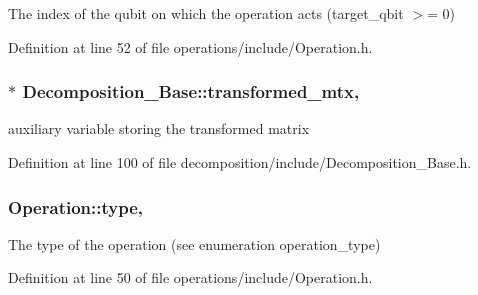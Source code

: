 The index of the qubit on which the operation acts (target\+\_\+qbit $>$= 0) 



Definition at line 52 of file operations/include/\+Operation.\+h.

\subsubsection[{\texorpdfstring{transformed\+\_\+mtx}{transformed_mtx}}]{ $\ast$ Decomposition\+\_\+\+Base\+::transformed\+\_\+mtx\hspace{0.3cm}{\ttfamily [protected]}, {\ttfamily [inherited]}}\hypertarget{class_decomposition___base_ae6fa4013266ee6e702b7e645c6bbfed1}{}\label{class_decomposition___base_ae6fa4013266ee6e702b7e645c6bbfed1}


auxiliary variable storing the transformed matrix 



Definition at line 100 of file decomposition/include/\+Decomposition\+\_\+\+Base.\+h.

\subsubsection[{\texorpdfstring{type}{type}}]{ Operation\+::type\hspace{0.3cm}{\ttfamily [protected]}, {\ttfamily [inherited]}}\hypertarget{class_operation_ad47c56c86d62a4c775571e1600416479}{}\label{class_operation_ad47c56c86d62a4c775571e1600416479}


The type of the operation (see enumeration operation\+\_\+type) 



Definition at line 50 of file operations/include/\+Operation.\+h.

